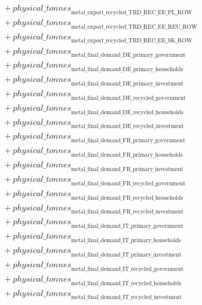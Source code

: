 \documentclass[11pt]{article}
\begin{document}
\begin{align*}
&\quad {}+ {physical\_tonnes}_{\text{metal\_export\_recycled\_TRD\_REC\_EE\_PL\_ROW}}\\
&\quad {}+ {physical\_tonnes}_{\text{metal\_export\_recycled\_TRD\_REC\_EE\_REU\_ROW}}\\
&\quad {}+ {physical\_tonnes}_{\text{metal\_export\_recycled\_TRD\_REC\_EE\_SK\_ROW}}\\
&\quad {}+ {physical\_tonnes}_{\text{metal\_final\_demand\_DE\_primary\_government}}\\
&\quad {}+ {physical\_tonnes}_{\text{metal\_final\_demand\_DE\_primary\_households}}\\
&\quad {}+ {physical\_tonnes}_{\text{metal\_final\_demand\_DE\_primary\_investment}}\\
&\quad {}+ {physical\_tonnes}_{\text{metal\_final\_demand\_DE\_recycled\_government}}\\
&\quad {}+ {physical\_tonnes}_{\text{metal\_final\_demand\_DE\_recycled\_households}}\\
&\quad {}+ {physical\_tonnes}_{\text{metal\_final\_demand\_DE\_recycled\_investment}}\\
&\quad {}+ {physical\_tonnes}_{\text{metal\_final\_demand\_FR\_primary\_government}}\\
&\quad {}+ {physical\_tonnes}_{\text{metal\_final\_demand\_FR\_primary\_households}}\\
&\quad {}+ {physical\_tonnes}_{\text{metal\_final\_demand\_FR\_primary\_investment}}\\
&\quad {}+ {physical\_tonnes}_{\text{metal\_final\_demand\_FR\_recycled\_government}}\\
&\quad {}+ {physical\_tonnes}_{\text{metal\_final\_demand\_FR\_recycled\_households}}\\
&\quad {}+ {physical\_tonnes}_{\text{metal\_final\_demand\_FR\_recycled\_investment}}\\
&\quad {}+ {physical\_tonnes}_{\text{metal\_final\_demand\_IT\_primary\_government}}\\
&\quad {}+ {physical\_tonnes}_{\text{metal\_final\_demand\_IT\_primary\_households}}\\
&\quad {}+ {physical\_tonnes}_{\text{metal\_final\_demand\_IT\_primary\_investment}}\\
&\quad {}+ {physical\_tonnes}_{\text{metal\_final\_demand\_IT\_recycled\_government}}\\
&\quad {}+ {physical\_tonnes}_{\text{metal\_final\_demand\_IT\_recycled\_households}}\\
&\quad {}+ {physical\_tonnes}_{\text{metal\_final\_demand\_IT\_recycled\_investment}}\\

\end{align*}
\end{document}
